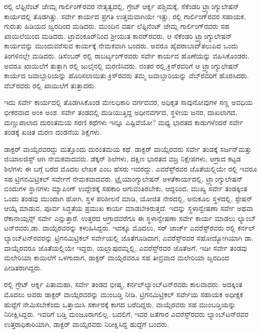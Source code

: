ರಲ್ಲಿ ಲೆಫ್ಟಿನೆಂಟ್​ ಜೇಮ್ಸ ಗಾರ್ಲಿಂಗ್​ರವರ ನೇತೃತ್ವದಲ್ಲಿ, ಗ್ರೇಟ್​ ಆರ್ಕ್ನ ಪಶ್ಚಿಮಕ್ಕೆ, ಸೆಕೆಂಡರಿ ಟ್ರ್ಯಾಂಗ್ಯುಲೇಷನ್​ ಕಾರ್ಯದಲ್ಲಿ ತೊಡಗಿತ್ತು. ಸರ್ವೇ ಕಾರ್ಯದ ಪ್ರಗತಿ ಉತ್ತಮವಾಗಿಯೇ ಇತ್ತು. ರಲ್ಲಿ ಗಾರ್ಲಿಂಗ್​ರವರ ಸಹಾಯಕ, ಗುರುತು ಹಿಡಿಯದ ಜ್ವರದಿಂದ ಮಡಿದರು. ಮುಂದಿನ ವರ್ಷ ಲೆಫ್ಟಿನೆಂಟ್​ ಜೇಮ್ಸ ಗಾರ್ಲಿಂಗ್​ರವರು ಸಹ ಖಾಯಿಲೆಯಿಂದ ಮಡಿದರು. ಟ್ರಾವಂಕೂರ್​ನಿಂದ ಶ‍್ರೀಯುತ ಕಾನರ್​ರವರು, ಆ ಸೆಕೆಂಡರಿ ಟ್ರ್ಯಾಂಗ್ಯುಲೇಷನ್​ ಕಾರ್ಯವನ್ನು ಮುಂದುವರೆಸುವ ಕಾರ್ಯಕ್ಕೆ ನೇಮಕವಾಗಿ ಬಂದರು. ಅವರೂ ಹೈದರಾಬಾದ್​ ತಲುಪಿದ ಒಂದು ತಿಂಗಳಿನಲ್ಲೇ ಮಡಿದರು. ಡಿಸೆಂಬರ್​ ರಲ್ಲಿ ರಾಬರ್ಟ್ಯಂಗ್​ರವರು ಸರ್ವೇ ಕಾರ್ಯದ ಹೊಣೆಯನ್ನು ವಹಿಸಿಕೊಂಡರು. ಅವರೂ ಖಾಯಿಲೆಗೆ ತುತ್ತಾಗಿ ರಲ್ಲಿ ಜುಲೈನಲ್ಲಿ ಮರಣಿಸಿದರು. ನಂತರ ರಲ್ಲಿ,\break ಕ್ರಿಸ್​ರವರಿಗೆ ಆ ಟ್ರ್ಯಾಂಗ್ಯುಲೇಷನ್​ ಕಾರ್ಯದ ಜವಾಬ್ದಾರಿಯನ್ನು ಹೊರಿಸಲಾಯಿತು.\break ಕ್ರಿಸ್​ರವರು ತಮ್ಮ ಜವಾಬ್ದಾರಿಯನ್ನು ವೆಬ್​ರವರಿಗೆ ಹೊರಸಿದರು. ವೆಬ್​ರವರು ರಲ್ಲಿ ಖಾಯಿಲೆಗೆ ತುತ್ತಾದರು.

ಇದು ಸರ್ವೇ ಕಾರ್ಯದಲ್ಲಿ ತೊಡಗಿಸಿಕೊಂಡ ಮೇಲಧಿಕಾರಿ ವರ್ಗದವರ, ಅಧಿಕೃತ ಸಾವುನೋವುಗಳ ಸಣ್ಣ ಅವಧಿಯ ಭೀಕರವಾದ ಅಂಕಿ ಅಂಶ. ಸರ್ವೇ ತಂಡದಲ್ಲಿ ದುಡಿಯುತ್ತಿದ್ದ ಅಧೀನವರ್ಗದ, ಸ್ಥಳೀಯ ಜನರ, ದಾಖಲಾಗದ, ಮಣ್ಣುಪಾಲಾದ ದುರಂತಮಯ ಸರಣಿ ಕಥೆಗಳು ಇನ್ನೂ ಎಷ್ಟಿವೆಯೋ? ಮಧ್ಯ ಭಾರತದ ಕಾಡುಗಳೆಂದರೆ ಸರ್ವೇ ತಂಡಕ್ಕೆ ಖಚಿತ ಮರಣ ದಂಡನೆಯ ಶಿಕ್ಷೆಗಳು.

ಡಾಕ್ಟರ್​ ವಾಯ್ಸೆರವರದ್ದು ಮತ್ತೊಂದು ದುರಂತಮಯ ಕಥೆ. ಡಾಕ್ಟರ್​ ವಾಯ್ಸೆರವರು ಸರ್ವೇ ತಂಡಕ್ಕೆ ಸರ್ಜನ್​ ಮತ್ತು ಜಿಯಾಲಜಿಸ್ಟ್​ ಆಗಿ ನೇಮಕವಾದವರು. ಡೆಕ್ಕನ್​ ಶಿಲೆಗಳು, ದಕ್ಷಿಣ ಭಾರತದ ವಜ್ರ ನಿಕ್ಷೇಪಗಳು, ಆಗ್ರಾದ ಕಟ್ಟಡ ಶಿಲೆಗಳು ಈ ಬಗ್ಗೆ ಬರೆದ ಮೊದಲ ಲೇಖಕ ಎಂಬ ಹೆಸರು ಇವರದ್ದು. ಎವರೆಸ್ಟ್​ರವರ ಜೊತೆಯಲ್ಲಿಯೇ ರಲ್ಲಿ ಇವರೂ ಸಹ ಟ್ರಿಗನಮಿಟ್ರಿಕಲ್​ ಸರ್ವೇಗೆ ನೇಮಕವಾದವರು. ಟ್ರೈಯಾಂಗ್ಯುಲೇಷನ್​ ಅಳತೆ\break ಕಾರ್ಯದಲ್ಲಿ, ಟ್ರ್ಯಾಂಗ್ಯುಲೇಷನ್​ ಬಿಂದುಗಳ ಸ್ಥಾನಗಳು ಮ್ಯಾಪಿಂಗ್​ ಉದ್ದೇಶಕ್ಕೆ ಸಹಕಾರಿ ಆಗುವಂತಿರಬೇಕು, ಆದ್ದರಿಂದ, ಮುಖ್ಯ ಸರ್ವೇ ತಂಡಕ್ಕಿಂತ ಒಂದು ತಂಡವು ಮುಂದಾಗಿ ಹೋಗಿ, ಸ್ಥಳ ಪರಿಶೀಲನೆ ಮಾಡಿ, ಯೋಜಿತ ನೇರದಲ್ಲಿ, ಅನುಕೂಲ ಸ್ಥಳದಲ್ಲಿ, ಸ್ಟೇಷನ್​ ಆಯ್ಕೆ ಮಾಡುವ, ಪೂರ್ವ ಸಿದ್ಧತೆಯ ಪ್ರಮುಖ ಕಾರ್ಯ ಮಾಡಬೇಕಿರುತ್ತದೆ. ಇದನ್ನು ಸ್ಥಳಾನ್ವೇಷಣಾ ಸರ್ವೇ ಅಥವಾ ರೆಕಾನಾಯ್ಸನ್ಸ್​ ಸರ್ವೇ ಎನ್ನುತ್ತಾರೆ. ಉತ್ತರದ ಆಗ್ರಾದವರೆಗೂ ಈ ಸ್ಥಳಾನ್ವೇಷಣಾ ಸರ್ವೇ ಕಾರ್ಯ ಮಾಡಲು ಲ್ಯಾಂಬ್​ಟನ್​ರವರು,\break ಡಾ. ವಾಯ್ಸೆರವರನ್ನು ಕಳುಹಿಸಿದ್ದರು. ಇದಕ್ಕೂ ಮೊದಲು, ಸರ್​ ಜಾರ್ಜ್ ಎವರೆಸ್ಟ್​ರವರು ರಲ್ಲಿ ಕರ್ನಲ್​ ಲ್ಯಾಂಬ್​ಟನ್​ರವರನ್ನು ಟ್ರಿಗನಮಿಟ್ರಿಕಲ್​ ಸರ್ವೇಯಲ್ಲಿ ಜೊತೆಗೂಡಿದಾಗ, ಎವರೆಸ್ಟ್​ರವರ ಸಹೋದ್ಯೋಗಿಯಾಗಿ ಡಾ. ವಾಯ್ಸೆರವರೂ ಜೊತೆಯಲ್ಲಿಯೇ ಇದ್ದರು. ಯಲ್ಲಾಪುರಮ್ನಲ್ಲಿ, ಎವರೆಸ್ಟ್​ರವರ ಜೊತೆಅಗೆ, ಇಡೀ ಸರ್ವೇ ತಂಡವು ಮಲೇರಿಯಾ ಕಾಯಿಲೆಗೆ ಒಳಗಾದಾಗ, ಡಾಕ್ಟರ್​ ವಾಯ್ಸೆರವರೂ ಸಹ ತೀವ್ರವಾದ ಮಲೇರಿಯಾ ಜ್ವರದಿಂದ ಪೀಡಿತರಾಗಿದ್ದರು.

ರಲ್ಲಿ ಗ್ರೇಟ್​ ಆರ್ಕ್ನ ಪಿತಾಮಹಾ, ಸರ್ವೇ ತಂಡದ ಭೀಷ್ಮ, ಕರ್ನಲ್​\break ಲ್ಯಾಂಬ್​ಟನ್​ರವರು ಕಾಲವಾದರು. ಅದಕ್ಕಿಂತ ಮೊದಲು ಅವರು ಡಾಕ್ಟರ್​ ವಾಯ್ಸೆರವರನ್ನು ಮುಂಬಡ್ತಿ ನೀಡಿ, ಟ್ರಿಗನಮಿಟ್ರಿಕಲ್​ ಸರ್ವೇಯ ಸಹಾಯಕ ಅಧೀಕ್ಷಕ ಹುದ್ದೆಗೆ ನೇಮಿಸಬೇಕೆಂದು ಒತ್ತಾಯಿಸಿ ಸರ್ಕಾರಕ್ಕೆ ಕಾಗದ ಬರೆದಿದ್ದರು. ವಾಯ್ಸೆರವರು ಸಹ ಮುಂಬಡ್ತಿಯನ್ನು ನಿರೀಕ್ಷಿಸಿದ್ದರು. ಇವರಿಗೆ ಬಡ್ತಿ ಮಂಜೂರಾಗಲಿಲ್ಲ. ಬದಲಿಗೆ, ಇವರ ಜತೆಗಾರ ಎವರೆಸ್ಟ್​ರವರು ಲ್ಯಾಂಬ್​ಟನ್​ರವರ ಉತ್ತರಾಧಿಕಾರಿಯಾಗಿ, ಡಾಕ್ಟರ್​ ವಾಯ್ಸೆರವರು ನಿರೀಕ್ಷಿಸಿದ್ದ ಹುದ್ದೆಗೆ ಬಂದರು.

